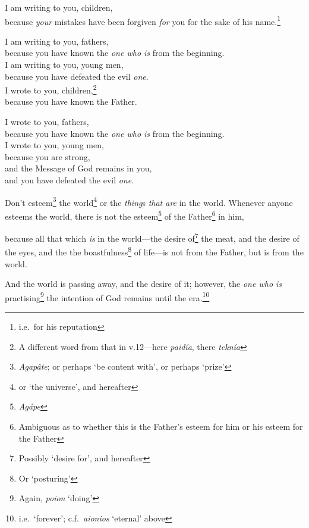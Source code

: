 \documentclass[article]{memoir}%
\newcounter{vnum}
\newcommand{\vnum}{%
	\textsuperscript{\thevnum}%
	\addtocounter{vnum}{1}%
}
\newcommand{\infer}[1]{\textit{#1}}
\newcommand{\focus}[1]{{#1}}
\newcommand{\lx}[1]{\textit{#1}}
\newcommand{\lxx}[2]{\textit{#1} `#2'}
\begin{document}
\indent \vnum I am writing to you, children,\\
\indent \indent because \infer{your} mistakes have been forgiven \infer{for} you for the sake of his name.\footnote{i.e.\ for his reputation} \\
\indent \vnum I am writing to you, fathers,\\
\indent \indent because you have known the \infer{one who is} from the beginning.\\
\indent I am writing to you, young men,\\
\indent \indent because you have defeated the evil \infer{one}.\\
\indent I wrote to you, children,\footnote{A different word from that in v.12---here \lx{paidía}, there \lx{teknía}}\\
\indent \indent because you have known the Father.\\
\indent \vnum I wrote to you, fathers,\\
\indent \indent because you have known the \infer{one who is} from the beginning.\\
\indent I wrote to you, young men,\\
\indent \indent because you are strong,\\
\indent \indent \indent and the Message of God remains in you,\\
\indent \indent \indent and you have defeated the evil \infer{one}.

\vnum Don't esteem\footnote{\lx{Agapâte}; or perhaps `be content with', or perhaps `prize'} the world\footnote{or `the universe', and hereafter} or the \infer{thing}s\infer{ that are} in the world. Whenever anyone esteems the world, there is not the esteem\footnote{\lx{Agápe}} of the Father\footnote{Ambiguous as to whether this is the Father's esteem for him or his esteem for the Father} in him, \vnum because all that which \infer{is} in the world---the desire of\footnote{Possibly `desire for', and hereafter} the meat, and the desire of the eyes, and the the boastfulness\footnote{Or `posturing'} of life---is \focus{not} from the Father, but is \focus{from the world}. \vnum And the world is passing away, and the desire of it; however, the \infer{one who is} practising\footnote{Again, \lxx{poion}{doing}} the intention of God remains until the era.\footnote{i.e.\ `forever'; c.f.\ \lxx{aionios}{eternal} above}
\end{document}
